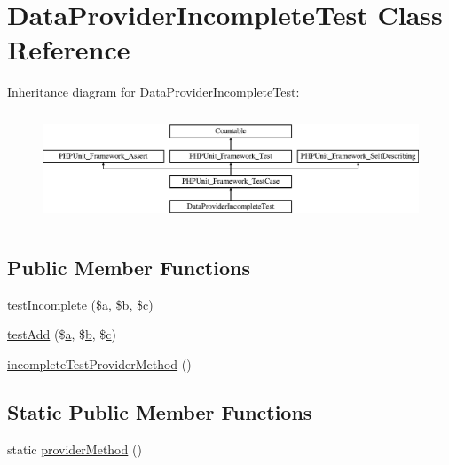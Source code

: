 \hypertarget{class_data_provider_incomplete_test}{}\section{Data\+Provider\+Incomplete\+Test Class Reference}
\label{class_data_provider_incomplete_test}
Inheritance diagram for Data\+Provider\+Incomplete\+Test\+:\begin{figure}[H]
\begin{center}
\leavevmode
\includegraphics[height=3.303835cm]{class_data_provider_incomplete_test}
\end{center}
\end{figure}
\subsection*{Public Member Functions}
\begin{DoxyCompactItemize}
\item 
\mbox{\hyperlink{class_data_provider_incomplete_test_a0365f9f81018cb0b6dc69297023aae35}{test\+Incomplete}} (\$\mbox{\hyperlink{interfacea}{a}}, \$\mbox{\hyperlink{interfaceb}{b}}, \$\mbox{\hyperlink{classc}{c}})
\item 
\mbox{\hyperlink{class_data_provider_incomplete_test_aee936425adb92ab632ef751353789f64}{test\+Add}} (\$\mbox{\hyperlink{interfacea}{a}}, \$\mbox{\hyperlink{interfaceb}{b}}, \$\mbox{\hyperlink{classc}{c}})
\item 
\mbox{\hyperlink{class_data_provider_incomplete_test_aa1a501caa5a97d85e666daf5e7da8c89}{incomplete\+Test\+Provider\+Method}} ()
\end{DoxyCompactItemize}
\subsection*{Static Public Member Functions}
\begin{DoxyCompactItemize}
\item 
static \mbox{\hyperlink{class_data_provider_incomplete_test_aa41ff734aa7d002dc2a7a32a9e35b499}{provider\+Method}} ()
\end{DoxyCompactItemize}
